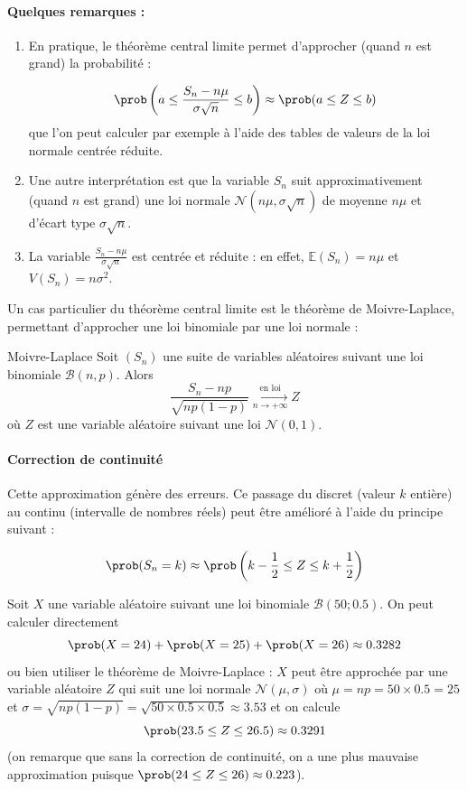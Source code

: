 \paragraph{Quelques remarques :}
			\begin{enumerate}
				\item En pratique, le théorème central limite permet d'approcher (quand $n$ est grand) la probabilité :
				
				$$\prob\left(a \leq \frac{S_n-n\mu}{\sigma \sqrt{n}} \leq b  \right) \approx \prob(a \leq Z \leq b)$$ que l'on peut calculer par exemple à l'aide des tables de valeurs de la loi normale centrée réduite.
				\item Une autre interprétation est que la variable $S_n$ suit approximativement (quand $n$ est grand) une loi normale $\mathcal{N}(n\mu,\sigma\sqrt{n})$ de moyenne $n\mu$ et d'écart type $\sigma\sqrt{n}$.
			\item La variable $\frac{S_n-n\mu}{\sigma \sqrt{n}}$ est centrée et réduite : en effet, $\mathbb{E}(S_n) = n\mu$ et $V(S_n) = n \sigma^2$.
			\end{enumerate}

	
		
		Un cas particulier du théorème central limite est le théorème de Moivre-Laplace, permettant d'approcher une loi binomiale par une loi normale :
		
\begin{theoreme}{Moivre-Laplace}
			Soit $(S_n)$ une suite de variables aléatoires suivant une loi binomiale $\mathcal{B}(n,p)$. Alors 
			$$\frac{S_n-np}{\sqrt{np(1-p)}}  \xrightarrow[n \to +\infty]{\text{en loi}}Z$$
			où $Z$ est une variable aléatoire suivant une loi $\mathcal{N}(0,1)$.
		\end{theoreme}
		

		\paragraph{Correction de continuité}
		
		Cette approximation génère des erreurs. Ce passage du discret (valeur $k$ entière) au continu (intervalle de nombres réels) peut être amélioré à l'aide du principe suivant : 
		
		$$\prob(S_n=k) \approx \prob\left(k-\frac{1}{2} \leq Z \leq k+\frac{1}{2}\right)$$
		
		\begin{exemple}{}{}
			Soit $X$ une variable aléatoire suivant une loi binomiale $\mathcal{B}(50;0.5)$. On peut calculer directement 
			$$\prob(X=24)+\prob(X=25)+\prob(X=26) \approx 0.3282$$
			ou bien utiliser le théorème de Moivre-Laplace : $X$ peut être approchée par une variable aléatoire $Z$ qui suit une loi normale $\mathcal{N}(\mu,\sigma)$ où $\mu = np = 50 \times 0.5 = 25$ et $\sigma=\sqrt{np(1-p)} = \sqrt{50 \times 0.5 \times 0.5} \approx 3.53$
			et on calcule 
			$$\prob(23.5 \leq Z \leq 26.5) \approx 0.3291$$
			(on remarque que sans la correction de continuité, on a une plus mauvaise approximation puisque $\prob(24 \leq Z \leq 26) \approx 0.223$).
		\end{exemple}
	
